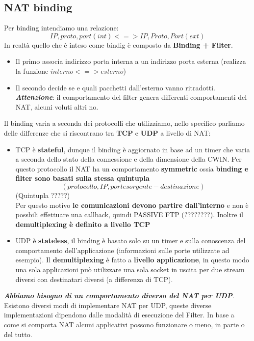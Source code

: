 \documentclass[12pt]{article}
\begin{document}
		\subsection{NAT binding}
			Per binding intendiamo una relazione: $${IP,proto,port}(int)<=>{IP,Proto,Port}(ext) $$
			In realtà quello che è inteso come bindig è composto da \textbf{Binding + Filter}.
			\begin{itemize}
				\item Il primo associa indirizzo porta interna a un indirizzo porta esterna (realizza la funzione $interno <=> esterno$)
				\item Il secondo decide se e quali pacchetti dall'esterno vanno ritradotti. \textbf{\textit{Attenzione}}: il comportamento del filter genera differenti comportamenti del NAT, alcuni voluti altri no.
			\end{itemize}
			Il binding varia a seconda dei protocolli che utilizziamo, nello specifico parliamo delle differenze che si riscontrano tra \textbf{TCP} e \textbf{UDP} a livello di NAT:
			\begin{itemize}
				\item TCP è \textbf{stateful}, dunque il binding è aggiornato in base ad un timer che varia a seconda dello stato della connessione e della dimensione della CWIN. Per questo protocollo il NAT ha un comportamento \textbf{symmetric} ossia \textbf{binding e filter sono basati sulla stessa quintupla} 
				$$(protocollo, IP, porte sorgente-destinazione) $$
				(Quintupla ?????)\\
				Per questo motivo \textbf{le comunicazioni  devono partire dall'interno} e non è possbili effettuare una callback, quindi PASSIVE FTP (????????). Inoltre il \textbf{demultiplexing è definito a livello TCP} 
				\item UDP è \textbf{stateless}, il binding è basato solo su un timer e sulla conoscenza del comportamento dell'applicazione (informazioni sulle porte utilizzate ad esempio). Il \textbf{demultiplexing} è fatto a \textbf{livello applicazione}, in questo modo una sola applicazioni può utilizzare una sola socket in uscita per due stream diversi con destinatari diversi (a differenza di TCP).
			\end{itemize}
			\textit{\textbf{Abbiamo bisogno di un comportamento diverso del NAT per UDP}}.\\
			Esistono diversi modi di implementare NAT per UDP, queste diverse implementazioni dipendono dalle modalità di esecuzione del Filter. In base a come si comporta NAT alcuni applicativi possono funzionare o meno, in parte o del tutto.
\end{document}

